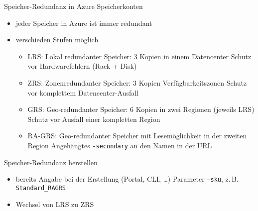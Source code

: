 \begin{flashcard}[Definition]{Speicher-Redundanz in Azure Speicherkonten}
    \begin{itemize}
        \item jeder Speicher in Azure ist immer redundant
        \item verschieden Stufen möglich
        \begin{itemize}
            \item LRS: Lokal redundanter Speicher: 3 Kopien in einem Datencenter\newline
                Schutz vor Hardwarefehlern (Rack + Disk)
            \item ZRS: Zonenredundanter Speicher: 3 Kopien Verfügbarkeitszonen\newline
                Schutz vor komplettem Datencenter-Ausfall
            \item GRS: Geo-redundanter Speicher: 6 Kopien in zwei Regionen (jeweils LRS)\newline
                Schutz vor Ausfall einer kompletten Region
            \item RA-GRS: Geo-redundanter Speicher mit Lesemöglichkeit in der zweiten Region\newline
            Angehängtes \texttt{-secondary} an den Namen in der URL
        \end{itemize}
    \end{itemize}
\end{flashcard}

\begin{flashcard}[Definition]{Speicher-Redundanz herstellen}
    \begin{itemize}
        \item bereits Angabe bei der Erstellung (Portal, CLI, \ldots)\newline
            Parameter \texttt{--sku}, z.\,B. \texttt{Standard\_RAGRS}
        \item Wechsel von LRS zu ZRS
    \end{itemize}
\end{flashcard}



